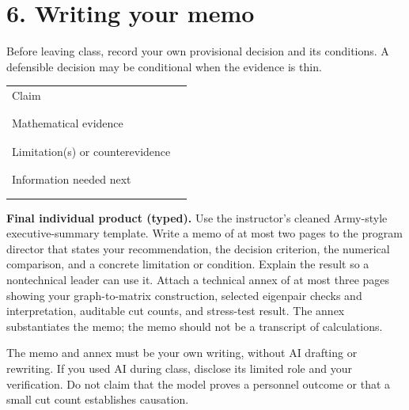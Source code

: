 \documentclass[10pt,letterpaper]{article}
\begin{document}
\section*{6. Writing your memo}
Before leaving class, record your own provisional decision and its conditions. A defensible decision may be conditional when the evidence is thin.

\begin{tabularx}{\linewidth}{@{}p{2in}Y@{}}
\toprule
Claim & \rule{0pt}{0.43in}\\
\\
\\
\midrule
Mathematical evidence & \rule{0pt}{0.54in}\\
\\
\\
\midrule
Limitation(s) or counterevidence & \rule{0pt}{0.54in}\\
\\
\\
\midrule
Information needed next & \rule{0pt}{0.46in}\\
\\
\\
\bottomrule
\end{tabularx}

\textbf{Final individual product (typed).} Use the instructor's cleaned Army-style executive-summary template. Write a memo of at most two pages to the program director that states your recommendation, the decision criterion, the numerical comparison, and a concrete limitation or condition. Explain the result so a nontechnical leader can use it. Attach a technical annex of at most three pages showing your graph-to-matrix construction, selected eigenpair checks and interpretation, auditable cut counts, and stress-test result. The annex substantiates the memo; the memo should not be a transcript of calculations.

The memo and annex must be your own writing, without AI drafting or rewriting. If you used AI during class, disclose its limited role and your verification. Do not claim that the model proves a personnel outcome or that a small cut count establishes causation.
\end{document}
